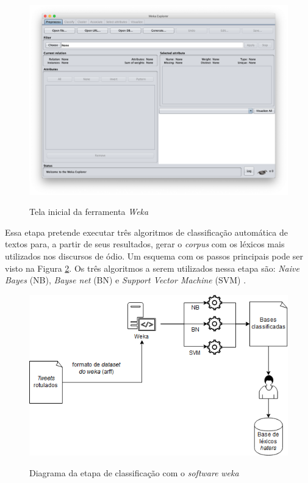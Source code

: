 \begin{figure}[!h]
\centering 
\caption{Tela inicial da ferramenta \textit{Weka}}
\includegraphics[scale=0.33]{imagens/wekatelainicial.png}
\label{fig:telaincialweka}
\end{figure}

Essa etapa pretende executar três algoritmos de classificação automática de textos para, a partir de seus resultados, gerar o \textit{corpus} com os léxicos mais utilizados nos discursos de ódio. Um esquema com os passos principais pode ser visto na Figura \ref{fig:wekaclassificacao}. Os três algoritmos a serem utilizados nessa etapa são: \textit{Naive Bayes} (NB), \textit{Bayse net} (BN) e \textit{Support Vector Machine} (SVM) \cite{Muralidharan2012,N18-1095}. 

\begin{figure}[!h]
\centering 
\caption{Diagrama da etapa de classificação com o \textit{software} \textit{weka}}
\includegraphics[scale=0.50]{imagens/wekaclassificacao.png}
\label{fig:wekaclassificacao}
\end{figure}

